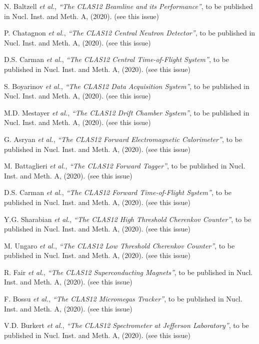 \begin{thebibliography}{99}

N. Baltzell {\it et al.}, {\it ``The CLAS12 Beamline and its Performance''}, to be published in Nucl. Inst.
and Meth. A, (2020). (see this issue)
  
P. Chatagnon {\it et al.}, {\it ``The CLAS12 Central Neutron Detector''}, to be published in Nucl. Inst.
and Meth. A, (2020). (see this issue)
  
D.S. Carman {\it et al.}, {\it ``The CLAS12 Central Time-of-Flight System''}, to be published in Nucl. Inst.
and Meth. A, (2020). (see this issue)
  
S. Boyarinov {\it et al.}, {\it ``The CLAS12 Data Acquisition System''}, to be published in Nucl. Inst.
and Meth. A, (2020). (see this issue)
  
M.D. Mestayer {\it et al.}, {\it ``The CLAS12 Drift Chamber System''}, to be published in Nucl. Inst.
and Meth. A, (2020). (see this issue)
  
G. Asryan {\it et al.}, {\it ``The CLAS12 Forward Electromagnetic Calorimeter''}, to be published in Nucl. Inst.
and Meth. A, (2020). (see this issue)
  
M. Battaglieri {\it et al.}, {\it ``The CLAS12 Forward Tagger''}, to be published in Nucl. Inst.
and Meth. A, (2020). (see this issue)
  
D.S. Carman {\it et al.}, {\it ``The CLAS12 Forward Time-of-Flight System''}, to be published in Nucl. Inst.
and Meth. A, (2020). (see this issue)
  
Y.G. Sharabian {\it et al.}, {\it ``The CLAS12 High Threshold Cherenkov Counter''}, to be published in Nucl. Inst.
and Meth. A, (2020). (see this issue)
  
M. Ungaro {\it et al.}, {\it ``The CLAS12 Low Threshold Cherenkov Counter''}, to be published in Nucl. Inst.
and Meth. A, (2020). (see this issue)
  
R. Fair {\it et al.}, {\it ``The CLAS12 Superconducting Magnets''}, to be published in Nucl. Inst.
and Meth. A, (2020). (see this issue)
  
F. Bossu {\it et al.}, {\it ``The CLAS12 Micromegas Tracker''}, to be published in Nucl. Inst.
and Meth. A, (2020). (see this issue)
  
V.D. Burkert {\it et al.}, {\it ``The CLAS12 Spectrometer at Jefferson Laboratory''}, to be published in Nucl. Inst.
and Meth. A, (2020). (see this issue)
  

\end{thebibliography}

